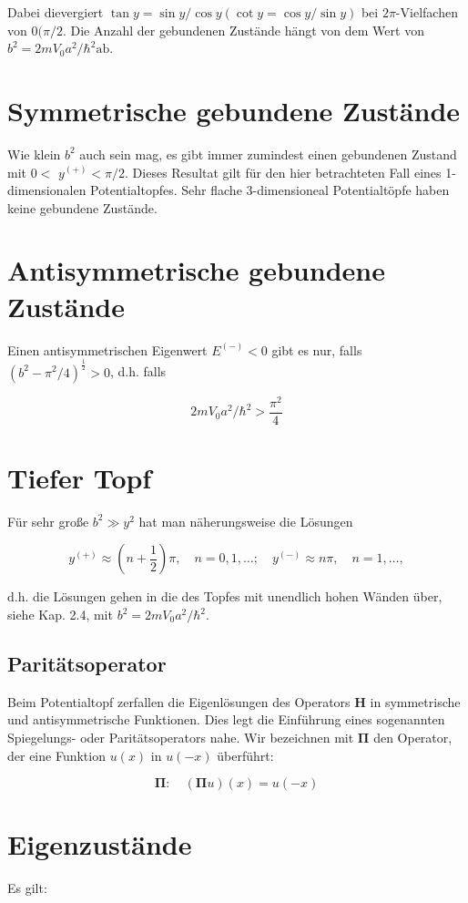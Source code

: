 \documentclass[10pt, letterpaper]{article}
\begin{document}
Dabei dievergiert $\tan y=\sin y / \cos y(\cot y=\cos y / \sin y)$ bei $2 \pi$-Vielfachen von $0(\pi / 2$. Die Anzahl der gebundenen Zustände hängt von dem Wert von $b^{2}=2 m V_{0} a^{2} / \hbar^{2} \mathrm{ab}$.

\section*{Symmetrische gebundene Zustände}
Wie klein $b^{2}$ auch sein mag, es gibt immer zumindest einen gebundenen Zustand mit $0<$ $y^{(+)}<\pi / 2$. Dieses Resultat gilt für den hier betrachteten Fall eines 1-dimensionalen Potentialtopfes. Sehr flache 3-dimensioneal Potentialtöpfe haben keine gebundene Zustände.

\section*{Antisymmetrische gebundene Zustände}
Einen antisymmetrischen Eigenwert $E^{(-)}<0$ gibt es nur, falls $\left(b^{2}-\pi^{2} / 4\right)^{\frac{1}{2}}>0$, d.h. falls

$$
2 m V_{0} a^{2} / \hbar^{2}>\frac{\pi^{2}}{4}
$$

\section*{Tiefer Topf}
Für sehr große $b^{2} \gg y^{2}$ hat man näherungsweise die Lösungen

$$
y^{(+)} \approx\left(n+\frac{1}{2}\right) \pi, \quad n=0,1, \ldots ; \quad y^{(-)} \approx n \pi, \quad n=1, \ldots,
$$

d.h. die Lösungen gehen in die des Topfes mit unendlich hohen Wänden über, siehe Kap. 2.4, mit $b^{2}=2 m V_{0} a^{2} / \hbar^{2}$.

\subsection*{Paritätsoperator}
Beim Potentialtopf zerfallen die Eigenlösungen des Operators $\mathbf{H}$ in symmetrische und antisymmetrische Funktionen. Dies legt die Einführung eines sogenannten Spiegelungs- oder Paritätsoperators nahe. Wir bezeichnen mit $\boldsymbol{\Pi}$ den Operator, der eine Funktion $u(x)$ in $u(-x)$ überführt:

$$
\boldsymbol{\Pi}: \quad(\boldsymbol{\Pi} u)(x)=u(-x)
$$

\section*{Eigenzustände}
Es gilt:
\end{document}
